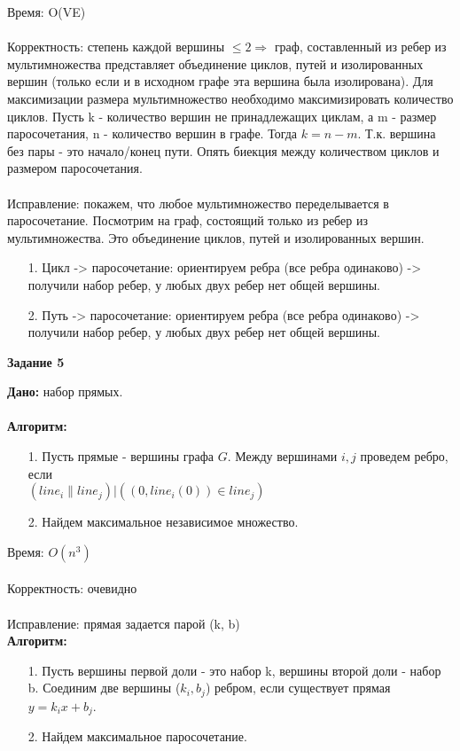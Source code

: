 \documentclass[12pt]{article} %
\begin{document}
	Время: O(VE)\\
	\\
	Корректность: степень каждой вершины $\le 2 \Rightarrow$ граф, составленный из ребер из мультимножества представляет 
				  объединение циклов, путей и изолированных вершин (только если и в исходном графе эта вершина была изолирована). Для максимизации размера мультимножество необходимо максимизировать количество циклов. Пусть k - количество вершин не принадлежащих циклам, а m - размер паросочетания, n - количество вершин в графе. Тогда $k = n - m$. Т.к. вершина без пары - это начало/конец пути. Опять биекция между количеством циклов и размером паросочетания.\\
	\\
	Исправление: покажем, что любое мультимножество переделывается в паросочетание. Посмотрим на граф, состоящий только из ребер из мультимножества.
	Это объединение циклов, путей и изолированных вершин. 
	\begin{enumerate}
		\item[1.] Цикл -> паросочетание: ориентируем ребра (все ребра одинаково) -> получили набор ребер, у любых двух ребер нет общей вершины.
		\item[2.] Путь -> паросочетание: ориентируем ребра (все ребра одинаково) -> получили набор ребер, у любых двух ребер нет общей вершины.
	\end{enumerate}
	\begin{center}
		\textbf{Задание 5}\\
	\end{center}
	\textbf{Дано:} набор прямых.\\
	\\
	\textbf{Алгоритм:}\\
	\begin{enumerate}
		\item[1.] Пусть прямые - вершины графа $G$. Между вершинами $i, j$ проведем ребро, если\\
		 $(line_i \parallel line_j) | ((0, line_i(0)) \in line_j)$
		\item[2.] Найдем максимальное независимое множество.
	\end{enumerate}
	Время: $O(n^3)$\\
	\\
	Корректность: очевидно\\
	\\
	Исправление: прямая задается парой (k, b)\\
		\textbf{Алгоритм:}\\
	\begin{enumerate}
		\item[1.] Пусть вершины первой доли - это набор k, вершины второй доли - набор b. Соединим две вершины ($k_i, b_j$) ребром,
		если существует прямая $y = k_ix + b_j$.
		\item[2.] Найдем максимальное паросочетание.
	\end{enumerate}
\end{document}
